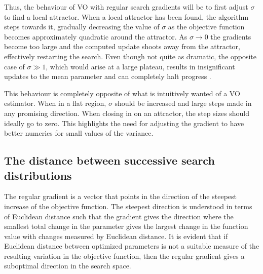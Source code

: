 Thus, the behaviour of \gls{VO} with regular search gradients will be to first adjust $\sigma$ to find a local attractor. When a local attractor has been found, the algorithm steps towards it, gradually decreasing the value of $\sigma$ as the objective function becomes approximately quadratic around the attractor. As $\sigma\rightarrow0$ the gradients become too large and the computed update shoots away from the attractor, effectively restarting the search. Even though not quite as dramatic, the opposite case of $\sigma\gg1$, which would arise at a large plateau, results in insignificant updates to the mean parameter and can completely halt progress \cite{Wierstra2008}.

This behaviour is completely opposite of what is intuitively wanted of a \gls{VO} estimator. When in a flat region, $\sigma$ should be increased and large steps made in any promising direction. When closing in on an attractor, the step sizes should ideally go to zero. This highlights the need for adjusting the gradient to have better numerics for small values of the variance.


\subsection{The distance between successive search distributions}\label{sec: Natural Gradient - The regular gradient and distances between successive search distributions}
The regular gradient is a vector that points in the direction of the steepest increase of the objective function. The steepest direction is understood in terms of Euclidean distance such that the gradient gives the direction where the smallest total change in the parameter gives the largest change in the function value with changes measured by Euclidean distance. It is evident that if Euclidean distance between optimized parameters is not a suitable measure of the resulting variation in the objective function, then the regular gradient gives a suboptimal direction in the search space.

